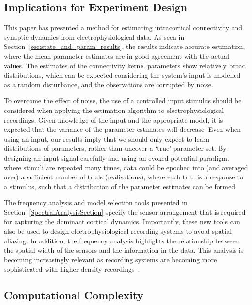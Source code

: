 \documentclass[10pt]{article}
\begin{document}
\subsection*{Implications for Experiment Design}

This paper has presented a method for estimating intracortical connectivity and synaptic dynamics from electrophysiological data. As seen in Section~\ref{sec:state_and_param_results}, the results indicate accurate estimation, where the mean parameter estimates are in good agreement with the actual values. The estimates of the connectivity kernel parameters show relatively broad distributions, which can be expected considering the system's input is modelled as a random disturbance, and the observations are corrupted by noise.

To overcome the effect of noise, the use of a controlled input stimulus should be considered when applying the estimation algorithm to electrophysiological recordings. Given knowledge of the input and the appropriate model, it is expected that the variance of the parameter estimates will decrease. Even when using an input, our results imply that we should only expect to learn distributions of parameters, rather than uncover a `true' parameter set. By designing an input signal carefully and using an evoked-potential paradigm, where stimuli are repeated many times, data could be epoched into (and averaged over) a sufficient number of trials (realisations), where each trial is a response to a stimulus, such that a distribution of the parameter estimates can be formed.

The frequency analysis and model selection tools presented in Section~\ref{SpectralAnalysisSection} specify the sensor arrangement that is required for capturing the dominant cortical dynamics. Importantly, these new tools can also be used to design electrophysiological recording systems to avoid spatial aliasing. In addition, the frequency analysis highlights the relationship between the spatial width of the sensors and the information in the data. This analysis is becoming increasingly relevant as recording systems are becoming more sophisticated with higher density recordings~\cite{Brinkmann2009}. 

\subsection*{Computational Complexity}
\end{document}
